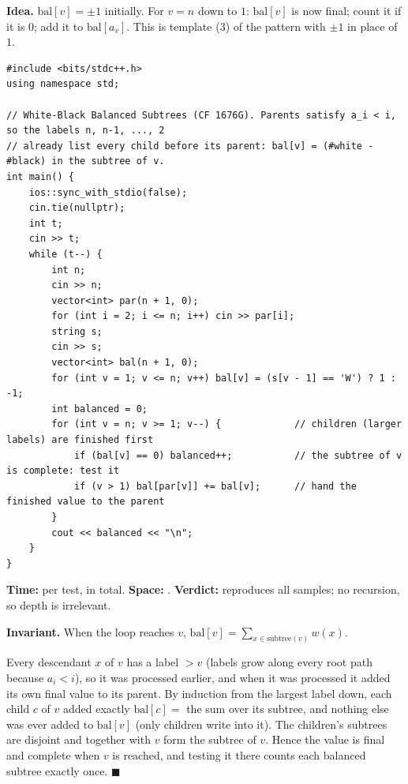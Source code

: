 \begin{algorithmbox}
\textbf{Idea.} $\mathrm{bal}[v] = \pm1$ initially. For $v = n$ down to $1$: $\mathrm{bal}[v]$ is now final; count it if it is 0; add it to $\mathrm{bal}[a_v]$. This is template (3) of the pattern with $\pm1$ in place of $1$.

\begin{lstlisting}[style=cpp]
#include <bits/stdc++.h>
using namespace std;

// White-Black Balanced Subtrees (CF 1676G). Parents satisfy a_i < i, so the labels n, n-1, ..., 2
// already list every child before its parent: bal[v] = (#white - #black) in the subtree of v.
int main() {
    ios::sync_with_stdio(false);
    cin.tie(nullptr);
    int t;
    cin >> t;
    while (t--) {
        int n;
        cin >> n;
        vector<int> par(n + 1, 0);
        for (int i = 2; i <= n; i++) cin >> par[i];
        string s;
        cin >> s;
        vector<int> bal(n + 1, 0);
        for (int v = 1; v <= n; v++) bal[v] = (s[v - 1] == 'W') ? 1 : -1;
        int balanced = 0;
        for (int v = n; v >= 1; v--) {             // children (larger labels) are finished first
            if (bal[v] == 0) balanced++;           // the subtree of v is complete: test it
            if (v > 1) bal[par[v]] += bal[v];      // hand the finished value to the parent
        }
        cout << balanced << "\n";
    }
}
\end{lstlisting}

\begin{complexitybox}
\textbf{Time:}  per test,  in total. \textbf{Space:} . \textbf{Verdict:} reproduces all samples; no recursion, so depth is irrelevant.
\end{complexitybox}
\end{algorithmbox}

\begin{invariantbox}
\textbf{Invariant.} When the loop reaches $v$, $\mathrm{bal}[v] = \sum_{x \in \mathrm{subtree}(v)} w(x)$.

Every descendant $x$ of $v$ has a label $> v$ (labels grow along every root path because $a_i < i$), so it was processed earlier, and when it was processed it added its own final value to its parent. By induction from the largest label down, each child $c$ of $v$ added exactly $\mathrm{bal}[c] = $ the sum over its subtree, and nothing else was ever added to $\mathrm{bal}[v]$ (only children write into it). The children's subtrees are disjoint and together with $v$ form the subtree of $v$. Hence the value is final and complete when $v$ is reached, and testing it there counts each balanced subtree exactly once. \hfill$\blacksquare$
\end{invariantbox}

